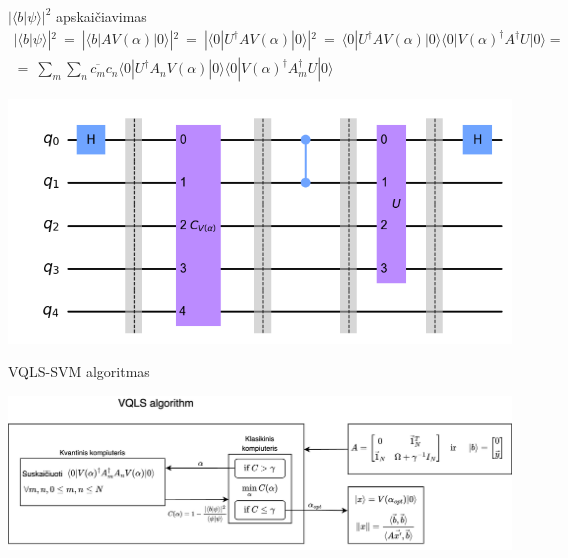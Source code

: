 \begin{frame}{$|\langle b|\psi \rangle|^2$ apskaičiavimas}
    \begin{gather}
         |\langle b | \psi \rangle|^2 \ = \ |\langle b | A V(\alpha) | 0 \rangle|^2 \ = \ |\langle 0 | U^{\dagger} A V(\alpha) | 0 \rangle|^2 \ = \ \langle 0 | U^{\dagger} A V(\alpha) | 0 \rangle \langle 0 | V(\alpha)^{\dagger} A^{\dagger} U |0\rangle = \nonumber \\
        = \ \displaystyle\sum_{m} \displaystyle\sum_{n} \overline{c_m} c_n \langle 0 | U^{\dagger} A_n V(\alpha) | 0 \rangle \langle 0 | V(\alpha)^{\dagger} A_m^{\dagger} U |0\rangle \nonumber
    \end{gather}
     \begin{center}
        \includegraphics[scale=0.55]{img/specialHadamardTest.png}
    \end{center}
\end{frame}

\begin{frame}{VQLS-SVM algoritmas}
    \begin{center}
        \includegraphics[scale=0.18]{img/VQLS.drawio.png}
    \end{center}
\end{frame}